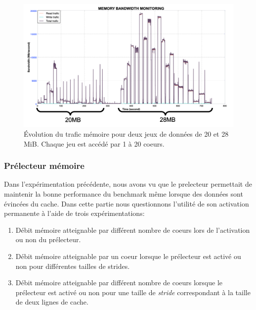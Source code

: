         \begin{figure}
        \center
        \includegraphics[width=14cm]{images/dml_bw_cacheL3.png}
        \caption{\label{pic:dml_bw_cacheL3} Évolution du trafic mémoire pour deux jeux de données de 20 et 28 MiB. Chaque jeu est accédé par 1 à 20 coeurs.}
        \end{figure}
        
        

    \subsubsection{Prélecteur mémoire}
        
        Dans l'expérimentation précédente, nous avons vu que le \gls{prelecteur} permettait de maintenir la bonne performance du benchmark même lorsque des données sont évincées du cache. Dans cette partie nous questionnons l'utilité de son activation permanente à l'aide de trois expérimentations:
        \begin{enumerate}
            \item Débit mémoire atteignable par différent nombre de coeurs lors de l'activation ou non du prélecteur.
            \item Débit mémoire atteignable par un coeur lorsque le prélecteur est activé ou non pour différentes tailles de \glspl{stride}.
            \item Débit mémoire atteignable par différent nombre de coeurs lorsque le prélecteur est activé ou non pour une taille de \textit{stride} correspondant à la taille de deux lignes de cache.
        \end{enumerate}

        
